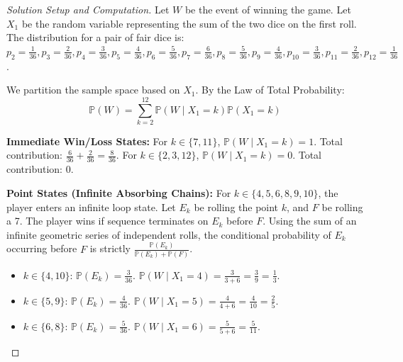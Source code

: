 \documentclass[12pt]{article}
\begin{document}
\begin{proof}[Solution Setup and Computation]
Let $W$ be the event of winning the game. Let $X_1$ be the random variable representing the sum of the two dice on the first roll. The distribution for a pair of fair dice is:
$p_2 = \frac{1}{36}, p_3 = \frac{2}{36}, p_4 = \frac{3}{36}, p_5 = \frac{4}{36}, p_6 = \frac{5}{36}, p_7 = \frac{6}{36}, p_8 = \frac{5}{36}, p_9 = \frac{4}{36}, p_{10} = \frac{3}{36}, p_{11} = \frac{2}{36}, p_{12} = \frac{1}{36}$.

We partition the sample space based on $X_1$. By the Law of Total Probability:
\[ \mathbb{P}(W) = \sum_{k=2}^{12} \mathbb{P}(W \mid X_1 = k)\mathbb{P}(X_1 = k) \]

\textbf{Immediate Win/Loss States:}
For $k \in \{7, 11\}$, $\mathbb{P}(W \mid X_1 = k) = 1$. Total contribution: $\frac{6}{36} + \frac{2}{36} = \frac{8}{36}$.
For $k \in \{2, 3, 12\}$, $\mathbb{P}(W \mid X_1 = k) = 0$. Total contribution: 0.

\textbf{Point States (Infinite Absorbing Chains):}
For $k \in \{4, 5, 6, 8, 9, 10\}$, the player enters an infinite loop state. Let $E_k$ be rolling the point $k$, and $F$ be rolling a 7. The player wins if sequence terminates on $E_k$ before $F$. 
Using the sum of an infinite geometric series of independent rolls, the conditional probability of $E_k$ occurring before $F$ is strictly $\frac{\mathbb{P}(E_k)}{\mathbb{P}(E_k) + \mathbb{P}(F)}$.
\begin{itemize}
    \item $k \in \{4, 10\}$: $\mathbb{P}(E_k) = \frac{3}{36}$. $\mathbb{P}(W \mid X_1 = 4) = \frac{3}{3 + 6} = \frac{3}{9} = \frac{1}{3}$.
    \item $k \in \{5, 9\}$: $\mathbb{P}(E_k) = \frac{4}{36}$. $\mathbb{P}(W \mid X_1 = 5) = \frac{4}{4 + 6} = \frac{4}{10} = \frac{2}{5}$.
    \item $k \in \{6, 8\}$: $\mathbb{P}(E_k) = \frac{5}{36}$. $\mathbb{P}(W \mid X_1 = 6) = \frac{5}{5 + 6} = \frac{5}{11}$.
\end{itemize}


\end{proof}
\end{document}
